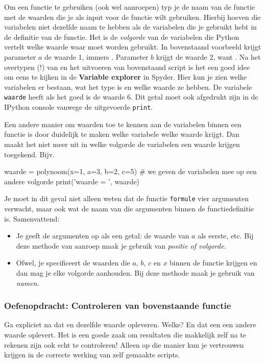 \documentclass[a4paper,11pt, fleqn]{article}
\begin{document}
Om een functie te gebruiken (ook wel aanroepen) typ je de naam van de functie met de waarden die je als input voor de functie wilt gebruiken. Hierbij hoeven die variabelen niet dezelfde naam te hebben als de variabelen die je gebruikt hebt in de definitie van de functie. Het is de \textit{volgorde} van de variabelen die Python vertelt welke waarde waar moet worden gebruikt. 
In bovenstaand voorbeeld krijgt parameter $a$ de waarde 1, immers . Parameter $b$ krijgt de waarde 2, want . 
Na het overtypen (!) van en het uitvoeren van bovenstaand script is het een goed idee om eens te kijken in de \textbf{Variable explorer} in Spyder. Hier kun je zien welke variabelen er bestaan, wat het type is en welke waarde ze hebben. De variabele \verb, waarde, heeft als het goed is de waarde 6. Dit getal moet ook afgedrukt zijn in de IPython console vanwege de uitgevoerde \verb,print,.

Een andere manier om waarden toe te kennen aan de variabelen binnen een functie is door duidelijk te maken welke variabele welke waarde krijgt. Dan maakt het niet meer uit in welke volgorde de variabelen een waarde krijgen toegekend. Bijv.

\begin{python}
waarde = polynoom(x=1, a=3, b=2, c=5) # we geven de variabelen mee op een andere volgorde
print('waarde = ', waarde)
\end{python}

Je moet in dit geval niet alleen weten dat de functie \verb,formule, vier argumenten verwacht, maar ook wat de naam van die argumenten binnen de functiedefinitie is. Samenvattend:
\begin{itemize}
\item Je geeft de argumenten op als een getal: de waarde van $a$ als eerste, etc.
Bij deze methode van aanroep maak je gebruik van \textit{positie of volgorde}.

\item Ofwel, je specificeert de waarden die $a$, $b$, $c$ en $x$ binnen de functie krijgen en dan mag je elke volgorde aanhouden. Bij deze methode maak je gebruik van \textit{namen}.
\end{itemize}

\subsubsection*{Oefenopdracht: Controleren van bovenstaande functie}
Ga expliciet na dat  en   dezelfde waarde opleveren. Welke? En dat een  een andere waarde oplevert. Het is een goede zaak om resultaten die makkelijk zelf na te rekenen zijn ook echt te controleren! Alleen op die manier kun je vertrouwen krijgen in de correcte werking van zelf gemaakte scripts.  
\end{document}

